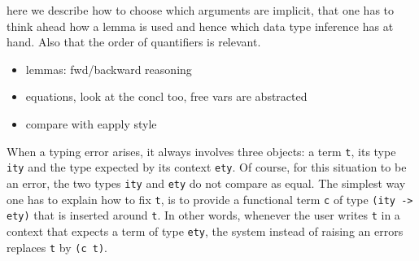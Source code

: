 % 
% 
% 
\label{sec:declaringimpl}

here we describe how to choose which arguments are implicit,
that one has to think ahead how  a lemma is used and hence
which data type inference has at hand.  Also that the order
of quantifiers is relevant.
\begin{itemize}
\item lemmas: fwd/backward reasoning
\item equations, look at the concl too, free vars are abstracted
\item compare with eapply style
\end{itemize}

\mcbREQUIRE{}
\mcbPROVIDE{}


When a typing error arises, it always involves three objects:
a term \lstinline/t/, its type \lstinline/ity/ and the type
expected by its context \lstinline/ety/.  Of course, for this
situation to be an error, the two types \lstinline/ity/ and
\lstinline/ety/ do not compare as equal.
The simplest way one has to explain \Coq{} how to fix \lstinline/t/,
is to provide a functional term \lstinline/c/ of type
\lstinline/(ity -> ety)/ that is inserted around \lstinline/t/.
In other words, whenever the user writes \lstinline/t/ in a context
that expects a term of type \lstinline/ety/, the system instead of
raising an errors replaces \lstinline/t/ by \lstinline/(c t)/.

